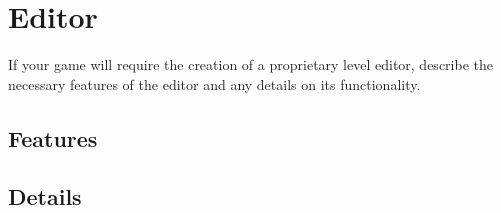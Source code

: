 \section{Editor} %
If your game will require the creation of a proprietary level editor, describe
the necessary features of the editor and any details on its functionality.


\subsection{Features}%

\subsection{Details}%